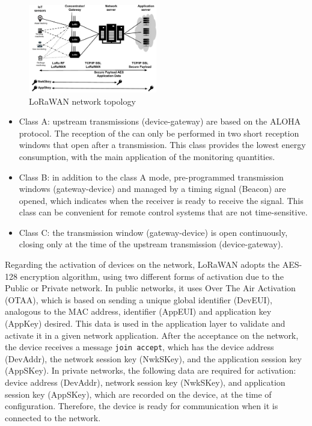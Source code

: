 \begin{figure}[!h]
 \begin{center}
\includegraphics[width=0.5\textwidth]{figs/topologia_lorawan-2.pdf}
  \end{center}
\caption{LoRaWAN network topology}  
\label{fig:topologia_lorawan}
\end{figure}


\begin{itemize}
\item Class A: upstream transmissions (device-gateway) are based on the ALOHA protocol. The reception of the can only be performed in two short reception windows that open after a transmission. This class provides the lowest energy consumption, with the main application of the monitoring quantities.
\item Class B: in addition to the class A mode, pre-programmed transmission windows (gateway-device) and managed by a timing signal (Beacon) are opened, which indicates when the receiver is ready to receive the signal. This class can be convenient for remote control systems that are not time-sensitive.
\item Class C: the transmission window (gateway-device) is open continuously, closing only at the time of the upstream transmission (device-gateway).
\end{itemize}

Regarding the activation of devices on the network, LoRaWAN adopts the AES-128 encryption algorithm, using two different forms of activation due to the Public or Private network. In public networks, it uses Over The Air Activation (OTAA), which is based on sending a unique global identifier (DevEUI), analogous to the MAC address, identifier (AppEUI) and application key (AppKey) desired. This data is used in the application layer to validate and activate it in a given network application. After the acceptance on the network, the device receives a message \texttt{join accept}, which has the device address (DevAddr), the network session key (NwkSKey), and the application session key (AppSKey). In private networks, the following data are required for activation: device address (DevAddr), network session key (NwkSKey), and application session key (AppSKey), which are recorded on the device, at the time of configuration. Therefore, the device is ready for communication when it is connected to the network.

